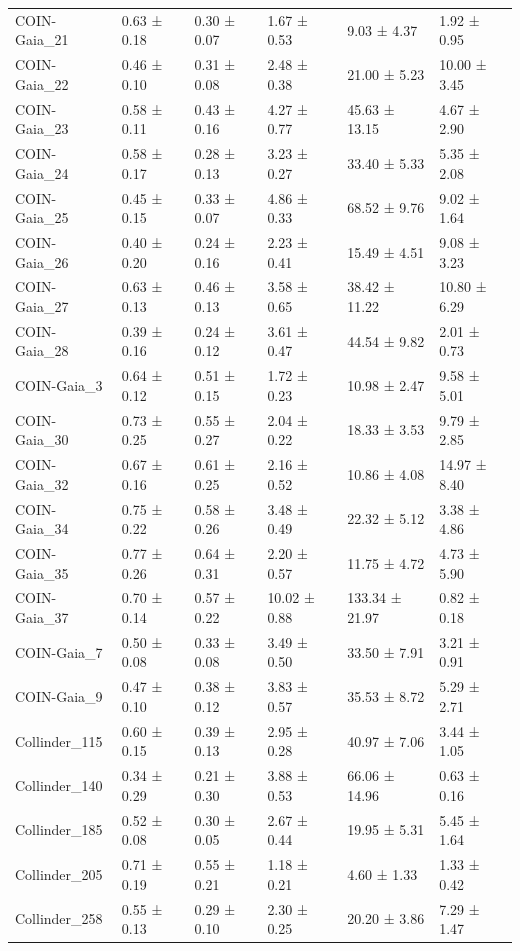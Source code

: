 \begin{tabular}{llllll}
COIN-Gaia_21 & 0.63 ± 0.18 & 0.30 ± 0.07 & 1.67 ± 0.53 & 9.03 ± 4.37 & 1.92 ± 0.95 \\
COIN-Gaia_22 & 0.46 ± 0.10 & 0.31 ± 0.08 & 2.48 ± 0.38 & 21.00 ± 5.23 & 10.00 ± 3.45 \\
COIN-Gaia_23 & 0.58 ± 0.11 & 0.43 ± 0.16 & 4.27 ± 0.77 & 45.63 ± 13.15 & 4.67 ± 2.90 \\
COIN-Gaia_24 & 0.58 ± 0.17 & 0.28 ± 0.13 & 3.23 ± 0.27 & 33.40 ± 5.33 & 5.35 ± 2.08 \\
COIN-Gaia_25 & 0.45 ± 0.15 & 0.33 ± 0.07 & 4.86 ± 0.33 & 68.52 ± 9.76 & 9.02 ± 1.64 \\
COIN-Gaia_26 & 0.40 ± 0.20 & 0.24 ± 0.16 & 2.23 ± 0.41 & 15.49 ± 4.51 & 9.08 ± 3.23 \\
COIN-Gaia_27 & 0.63 ± 0.13 & 0.46 ± 0.13 & 3.58 ± 0.65 & 38.42 ± 11.22 & 10.80 ± 6.29 \\
COIN-Gaia_28 & 0.39 ± 0.16 & 0.24 ± 0.12 & 3.61 ± 0.47 & 44.54 ± 9.82 & 2.01 ± 0.73 \\
COIN-Gaia_3 & 0.64 ± 0.12 & 0.51 ± 0.15 & 1.72 ± 0.23 & 10.98 ± 2.47 & 9.58 ± 5.01 \\
COIN-Gaia_30 & 0.73 ± 0.25 & 0.55 ± 0.27 & 2.04 ± 0.22 & 18.33 ± 3.53 & 9.79 ± 2.85 \\
COIN-Gaia_32 & 0.67 ± 0.16 & 0.61 ± 0.25 & 2.16 ± 0.52 & 10.86 ± 4.08 & 14.97 ± 8.40 \\
COIN-Gaia_34 & 0.75 ± 0.22 & 0.58 ± 0.26 & 3.48 ± 0.49 & 22.32 ± 5.12 & 3.38 ± 4.86 \\
COIN-Gaia_35 & 0.77 ± 0.26 & 0.64 ± 0.31 & 2.20 ± 0.57 & 11.75 ± 4.72 & 4.73 ± 5.90 \\
COIN-Gaia_37 & 0.70 ± 0.14 & 0.57 ± 0.22 & 10.02 ± 0.88 & 133.34 ± 21.97 & 0.82 ± 0.18 \\
COIN-Gaia_7 & 0.50 ± 0.08 & 0.33 ± 0.08 & 3.49 ± 0.50 & 33.50 ± 7.91 & 3.21 ± 0.91 \\
COIN-Gaia_9 & 0.47 ± 0.10 & 0.38 ± 0.12 & 3.83 ± 0.57 & 35.53 ± 8.72 & 5.29 ± 2.71 \\
Collinder_115 & 0.60 ± 0.15 & 0.39 ± 0.13 & 2.95 ± 0.28 & 40.97 ± 7.06 & 3.44 ± 1.05 \\
Collinder_140 & 0.34 ± 0.29 & 0.21 ± 0.30 & 3.88 ± 0.53 & 66.06 ± 14.96 & 0.63 ± 0.16 \\
Collinder_185 & 0.52 ± 0.08 & 0.30 ± 0.05 & 2.67 ± 0.44 & 19.95 ± 5.31 & 5.45 ± 1.64 \\
Collinder_205 & 0.71 ± 0.19 & 0.55 ± 0.21 & 1.18 ± 0.21 & 4.60 ± 1.33 & 1.33 ± 0.42 \\
Collinder_258 & 0.55 ± 0.13 & 0.29 ± 0.10 & 2.30 ± 0.25 & 20.20 ± 3.86 & 7.29 ± 1.47 \\

\end{tabular}
